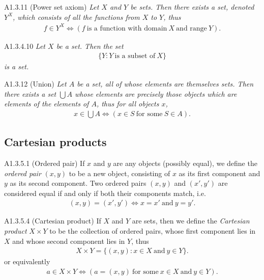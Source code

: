\begin{axiom}{A1.3.11}
    (Power set axiom) \emph{Let $X$ and $Y$ be sets. Then there exists a set, denoted $Y^X$, which consists of all the
    functions from $X$ to $Y$, thus
    \begin{align*}
        f\in Y^X \iff (f~\text{is a function with domain}~X~\text{and range}~Y).
    \end{align*}}
\end{axiom}

\begin{lemma}{A1.3.4.10}
    \emph{Let $X$ be a set. Then the set
    \begin{align*}
        \{Y:Y~\text{is a subset of}~X\}
    \end{align*}
    is a set.}
\end{lemma}

\begin{axiom}{A1.3.12}
    (Union) \emph{Let $A$ be a set, all of whose elements are themselves sets. Then there exists a set $\bigcup A$ whose
    elements are precisely those objects which are elements of the elements of $A$, thus for all objects $x$,
    \begin{align*}
        x\in \bigcup A \iff (x\in S~\text{for some}~S\in A).
    \end{align*}}
\end{axiom}

\subsection{Cartesian products}
\begin{definition}{A1.3.5.1}
    (Ordered pair) If $x$ and $y$ are any objects (possibly equal), we define the \emph{ordered pair} $(x, y)$ to be a
    new object, consisting of $x$ as its first component and $y$ as its second component. Two ordered pairs $(x, y)$ and
    $(x', y')$ are considered equal if and only if both their components match, i.e.
    \begin{align*}
        (x, y) = (x', y') \iff x=x'~\text{and}~y=y'.
    \end{align*}
\end{definition}

\begin{definition}{A1.3.5.4}
    (Cartesian product) If $X$ and $Y$ are sets, then we define the \emph{Cartesian product} $X\times Y$ to be the collection
    of ordered pairs, whose first component lies in $X$ and whose second component lies in $Y$, thus
    \begin{align*}
        X\times Y = \{(x, y):x\in X~\text{and}~y\in Y\}.
    \end{align*}
    or equivalently
    \begin{align*}
        a\in X\times Y \iff (a=(x, y)~\text{for some}~x\in X~\text{and}~y\in Y).
    \end{align*}
\end{definition}

